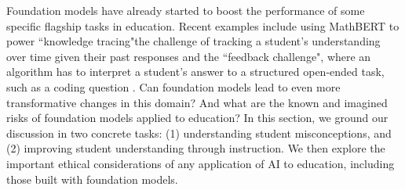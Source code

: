 
Foundation models have already started to boost the performance of some specific flagship tasks in education. Recent examples include using MathBERT \cite{shen2021mathbert} to power ``knowledge tracing"\dash{}the challenge of tracking a student's understanding over time given their past responses\dash{} and the ``feedback challenge", where an algorithm has to interpret a student's answer to a structured open-ended task, such as a coding question \citep{wu2021prototransf}. Can foundation models lead to even more transformative changes in this domain? And what are the known and imagined risks of foundation models applied to education? In this section, we ground our discussion in two concrete tasks: (1) understanding student misconceptions, and (2) improving student understanding through instruction. We then explore the important ethical considerations of any application of AI to education, including those built with foundation models.


